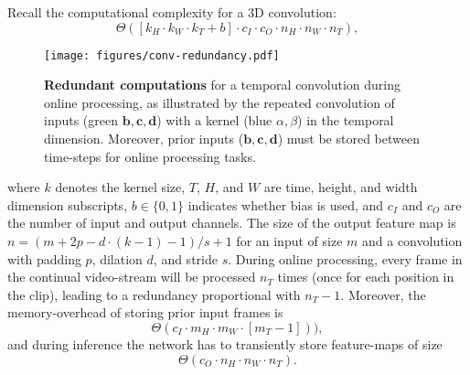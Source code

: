 Recall the computational complexity for a 3D convolution:
\begin{equation}
    \Theta( [k_H \cdot k_W \cdot k_T + b] \cdot c_I \cdot c_O \cdot n_H \cdot n_W \cdot n_T ),
\end{equation}
%
\begin{figure}
    \centering
    \texttt{[image: figures/conv-redundancy.pdf]}
	\caption{
	\textbf{Redundant computations} for a temporal convolution during online processing, as illustrated by the repeated convolution of inputs (green $\mathbf{b,c,d}$) with a kernel (blue $\alpha, \beta$) in the temporal dimension.
	Moreover, prior inputs ($\mathbf{b,c,d}$) must be stored between time-steps for online processing tasks. }
    \label{fig:conv-redundancy}
    \vspace{-5mm}
\end{figure}
%
where $k$ denotes the kernel size, $T$, $H$, and $W$ are time, height, and width dimension subscripts, $b \in \{0,1\}$ indicates whether bias is used, and $c_I$ and $c_O$ are the number of input and output channels. 
The size of the output feature map is $n = (m + 2p - d \cdot (k-1) - 1)/s + 1$ for an input of size $m$ and a convolution with padding $p$, dilation $d$, and stride $s$.
%
During online processing, every frame in the continual video-stream will be processed $n_T$ times (once for each position in the clip), leading to a redundancy proportional with $n_T-1$.
%
Moreover, the memory-overhead of storing prior input frames is 
\begin{equation}
    \Theta(c_I \cdot m_H \cdot m_W \cdot [m_T - 1])),
\label{eq:conv-mem-store-frames}
\end{equation}
%
and during inference the network has to transiently store feature-maps of size 
\begin{equation}
    \Theta(c_O \cdot n_H \cdot n_W \cdot n_T).
    \label{eq:reg-conv-transient}
\end{equation}




